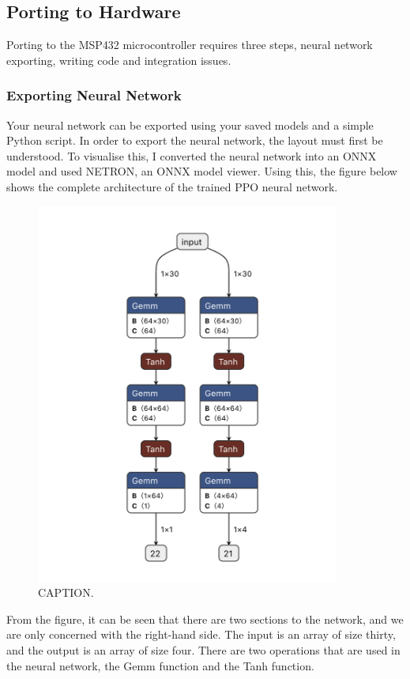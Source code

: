 \documentclass[12pt]{article}
\begin{document}
\subsection{Porting to Hardware}

Porting to the MSP432 microcontroller requires three steps, neural network exporting, writing code and integration issues. 

\subsubsection{Exporting Neural Network}
Your neural network can be exported using your saved models and a simple Python script. In order to export the neural network, the layout must first be understood. To visualise this, I converted the neural network into an ONNX model and used NETRON, an ONNX model viewer. Using this, the figure below shows the complete architecture of the trained PPO neural network. 

\begin{figure}[H]
\label{fig:1}
\centering
\includegraphics[width=10cm]{imgs/HistoryNetron.png}
\caption{CAPTION.}
\end{figure}


From the figure, it can be seen that there are two sections to the network, and we are only concerned with the right-hand side. The input is an array of size thirty, and the output is an array of size four. There are two operations that are used in the neural network, the Gemm function and the Tanh function. 
\end{document}
